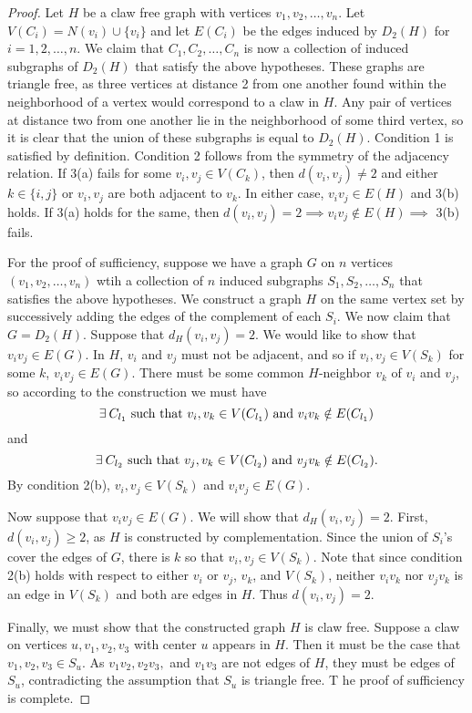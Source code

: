 \begin{proof}
Let $H$ be a claw free graph with vertices $v_1, v_2, \ldots, v_n$.  Let $V(C_i) = N(v_i) \cup \{v_i\}$ and let $E(C_i)$ be the edges induced by $D_2(H)$ for $i = 1,2,\ldots, n$.  We claim that $C_1, C_2, \ldots, C_n$ is now a collection of induced subgraphs of $D_2(H)$ that satisfy the above hypotheses.  These graphs are triangle free, as three vertices at distance 2 from one another found within the neighborhood of a vertex would correspond to a claw in $H$.  Any pair of vertices at distance two from one another lie in the neighborhood of some third vertex, so it is clear that the union of these subgraphs is equal to $D_2(H)$.  Condition 1 is satisfied by definition.  Condition 2 follows from the symmetry of the adjacency relation.  If 3(a) fails for some $v_i, v_j \in V(C_k)$, then $d(v_i, v_j) \neq 2$ and either $k \in \{i,j\}$ or $v_i, v_j$ are both adjacent to $v_k$.  In either case, $v_iv_j \in E(H)$ and 3(b) holds.  If 3(a) holds for the same, then $d(v_i, v_j) = 2 \implies v_iv_j \notin E(H) \implies$ 3(b) fails.

For the proof of sufficiency, suppose we have a graph $G$ on $n$ vertices $(v_1, v_2, \ldots, v_n)$ wtih a collection of $n$ induced subgraphs $S_1, S_2, \ldots, S_n$ that satisfies the above hypotheses.  We construct a graph $H$ on the same vertex set by successively adding the edges of the complement of each $S_i$.  We now claim that $G = D_2(H)$.  Suppose that $d_H(v_i, v_j) = 2$.  We would like to show that $v_iv_j\in E(G)$.  In $H$, $v_i$ and $v_j$ must not be adjacent, and so if $v_i, v_j \in V(S_k)$ for some $k$, $v_iv_j \in E(G)$.  There must be some common $H$-neighbor $v_k$ of $v_i$ and $v_j$, so according to the construction we must have
\[\exists\: C_{l_1} \makebox{ such that } v_i, v_k \in V(C_{l_1}) \makebox{ and } v_iv_k\notin E(C_{l_1})\] and
\[\exists\: C_{l_2} \makebox{ such that } v_j, v_k \in V(C_{l_2}) \makebox{ and } v_jv_k\notin E(C_{l_2}).\]  By condition 2(b), $v_i, v_j \in V(S_k)$ and $v_iv_j \in E(G)$.

Now suppose that $v_iv_j \in E(G)$.  We will show that $d_H(v_i, v_j) = 2$.  First, $d(v_i,v_j) \geq 2$, as $H$ is constructed by complementation.  Since the union of $S_i$'s cover the edges of $G$, there is $k$ so that $v_i, v_j \in V(S_k)$.  Note that since condition 2(b) holds with respect to either $v_i$ or $v_j$, $v_k$, and $V(S_k)$, neither $v_iv_k$ nor $v_jv_k$ is an edge in $V(S_k)$ and both are edges in $H$.  Thus $d(v_i, v_j) = 2$.

Finally, we must show that the constructed graph $H$ is claw free.  Suppose a claw on vertices $u, v_1, v_2, v_3$  with center $u$ appears in $H$.  Then it must be the case that $v_1, v_2, v_3 \in S_u$.  As $v_1v_2, v_2v_3,$ and $v_1v_3$ are not edges of $H$, they must be edges of $S_u$, contradicting the assumption that $S_u$ is triangle free. T he proof of sufficiency is complete.
\end{proof}

	
